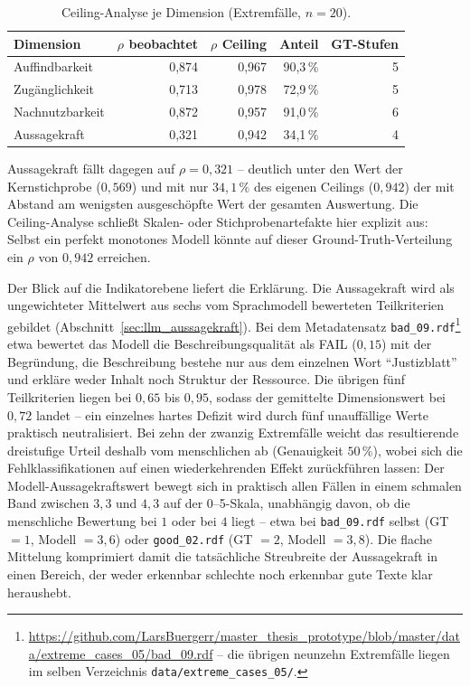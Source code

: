 \begin{table}[H]
    \centering
    \scriptsize
    \renewcommand{\arraystretch}{1.2}
    \begin{tabular}{lrrrr}
    \hline
    \textbf{Dimension} & \textbf{$\rho$ beobachtet} & \textbf{$\rho$ Ceiling} & \textbf{Anteil} & \textbf{GT-Stufen} \\
    \hline
    Auffindbarkeit & 0,874 & 0,967 & 90,3\,\% & 5 \\
    Zugänglichkeit & 0,713 & 0,978 & 72,9\,\% & 5 \\
    Nachnutzbarkeit & 0,872 & 0,957 & 91,0\,\% & 6 \\
    Aussagekraft & 0,321 & 0,942 & 34,1\,\% & 4 \\
    \hline
    \end{tabular}
    \captionsetup{justification=centering}
    \caption[Ceiling-Analyse der Extremfälle]{Ceiling-Analyse je Dimension (Extremfälle, $n=20$).}
    \label{tab:gt_extrem_ceiling}
\end{table}

Aussagekraft fällt dagegen auf $\rho = 0{,}321$ -- deutlich unter den Wert der
Kernstichprobe ($0{,}569$) und mit nur $34{,}1\,\%$ des eigenen Ceilings ($0{,}942$)
der mit Abstand am wenigsten ausgeschöpfte Wert der gesamten Auswertung. Die
Ceiling-Analyse schließt Skalen- oder Stichprobenartefakte hier explizit aus: Selbst
ein perfekt monotones Modell könnte auf dieser Ground-Truth-Verteilung ein $\rho$ von
$0{,}942$ erreichen.

Der Blick auf die Indikatorebene liefert die Erklärung. Die Aussagekraft wird als
ungewichteter Mittelwert aus sechs vom Sprachmodell bewerteten Teilkriterien
gebildet (Abschnitt~\ref{sec:llm_aussagekraft}). Bei dem Metadatensatz
\texttt{bad\_09.rdf}\footnote{\url{https://github.com/LarsBuergerr/master_thesis_prototype/blob/master/data/extreme_cases_05/bad_09.rdf} -- die übrigen neunzehn Extremfälle liegen im selben Verzeichnis \texttt{data/extreme\_cases\_05/}.} etwa bewertet das Modell die 
Beschreibungsqualität als FAIL ($0{,}15$) mit der
Begründung, die Beschreibung bestehe nur aus dem einzelnen Wort \enquote{Justizblatt}
und erkläre weder Inhalt noch Struktur der Ressource. Die übrigen fünf Teilkriterien
liegen bei $0{,}65$ bis $0{,}95$, sodass der gemittelte Dimensionswert bei $0{,}72$
landet -- ein einzelnes hartes Defizit wird durch fünf unauffällige Werte praktisch
neutralisiert. Bei zehn der zwanzig Extremfälle weicht das resultierende
dreistufige Urteil deshalb vom menschlichen ab (Genauigkeit $50\,\%$), wobei sich die
Fehlklassifikationen auf einen wiederkehrenden Effekt zurückführen lassen: Der
Modell-Aussagekraftswert bewegt sich in praktisch allen Fällen in einem schmalen
Band zwischen $3{,}3$ und $4{,}3$ auf der 0--5-Skala, unabhängig davon, ob die
menschliche Bewertung bei $1$ oder bei $4$ liegt -- etwa bei \texttt{bad\_09.rdf}
selbst (GT $=1$, Modell $=3{,}6$) oder \texttt{good\_02.rdf} (GT $=2$, Modell
$=3{,}8$). Die flache Mittelung komprimiert damit die tatsächliche Streubreite der
Aussagekraft in einen Bereich, der weder erkennbar schlechte noch erkennbar gute
Texte klar heraushebt.

